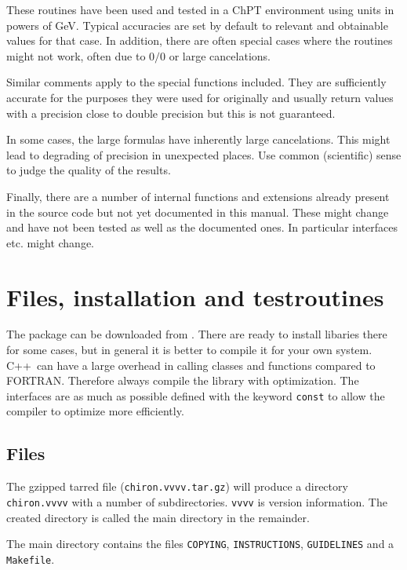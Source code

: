 \documentclass[12pt,a4paper]{article}
\newcommand{\mytt}[1]{\texttt{#1}}
\newcommand{\cpp}{\textsc{C++}}
\newcommand{\fortran}{\textsc{FORTRAN}}
\begin{document}
These routines have been used and tested in a ChPT environment using
units in powers of GeV. Typical accuracies are set by default to relevant
and obtainable values for that case. In addition, there are often special cases
where the routines might not work, often due to $0/0$ or large cancelations.

Similar comments apply to the special functions 
included. They are sufficiently accurate for the purposes they were used for
originally and usually return values with a precision close to
double precision but this is not guaranteed.

In some cases, the large formulas have inherently large cancelations.
This might lead to degrading of precision in unexpected places. Use common
(scientific) sense to judge the quality of the results.

Finally, there are a number of internal functions and extensions
already present in the source code but not yet documented in this manual.
These might change and have not been tested as well as the documented ones.
In particular interfaces etc. might change.

\section{Files, installation and testroutines}

The package can be downloaded from \cite{chironsite}.
There are ready to install libaries there for some cases, but in general
it is better to compile it for your own system.
\cpp\ can have a large overhead in calling classes and functions
compared to \fortran. Therefore always compile the library with
optimization. The interfaces are as much as possible defined with the
keyword \mytt{const} to allow the compiler to optimize more efficiently.

\subsection{Files}
\label{files}

The gzipped tarred file (\mytt{chiron.vvvv.tar.gz}) will produce
a directory \mytt{chiron.vvvv} with a number of subdirectories.
\mytt{vvvv} is version information. The created directory is called the
main directory in the remainder.

The main directory contains the files \mytt{COPYING}, \mytt{INSTRUCTIONS},
\mytt{GUIDELINES} and a \mytt{Makefile}.
\end{document}
